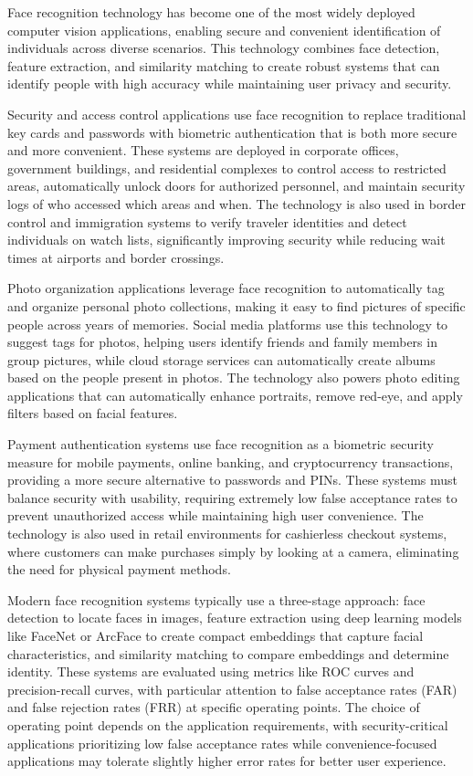 Face recognition technology has become one of the most widely deployed computer vision applications, enabling secure and convenient identification of individuals across diverse scenarios. This technology combines face detection, feature extraction, and similarity matching to create robust systems that can identify people with high accuracy while maintaining user privacy and security.

Security and access control applications use face recognition to replace traditional key cards and passwords with biometric authentication that is both more secure and more convenient. These systems are deployed in corporate offices, government buildings, and residential complexes to control access to restricted areas, automatically unlock doors for authorized personnel, and maintain security logs of who accessed which areas and when. The technology is also used in border control and immigration systems to verify traveler identities and detect individuals on watch lists, significantly improving security while reducing wait times at airports and border crossings.

Photo organization applications leverage face recognition to automatically tag and organize personal photo collections, making it easy to find pictures of specific people across years of memories. Social media platforms use this technology to suggest tags for photos, helping users identify friends and family members in group pictures, while cloud storage services can automatically create albums based on the people present in photos. The technology also powers photo editing applications that can automatically enhance portraits, remove red-eye, and apply filters based on facial features.

Payment authentication systems use face recognition as a biometric security measure for mobile payments, online banking, and cryptocurrency transactions, providing a more secure alternative to passwords and PINs. These systems must balance security with usability, requiring extremely low false acceptance rates to prevent unauthorized access while maintaining high user convenience. The technology is also used in retail environments for cashierless checkout systems, where customers can make purchases simply by looking at a camera, eliminating the need for physical payment methods.

Modern face recognition systems typically use a three-stage approach: face detection to locate faces in images, feature extraction using deep learning models like FaceNet or ArcFace to create compact embeddings that capture facial characteristics, and similarity matching to compare embeddings and determine identity. These systems are evaluated using metrics like ROC curves and precision-recall curves, with particular attention to false acceptance rates (FAR) and false rejection rates (FRR) at specific operating points. The choice of operating point depends on the application requirements, with security-critical applications prioritizing low false acceptance rates while convenience-focused applications may tolerate slightly higher error rates for better user experience.


